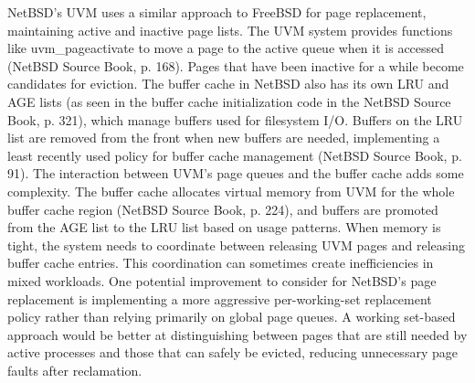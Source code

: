 NetBSD's UVM uses a similar approach to FreeBSD for page replacement, maintaining active and inactive page lists. The UVM system provides functions like uvm\_pageactivate to move a page to the active queue when it is accessed (NetBSD Source Book, p. 168). Pages that have been inactive for a while become candidates for eviction. The buffer cache in NetBSD also has its own LRU and AGE lists (as seen in the buffer cache initialization code in the NetBSD Source Book, p. 321), which manage buffers used for filesystem I/O. Buffers on the LRU list are removed from the front when new buffers are needed, implementing a least recently used policy for buffer cache management (NetBSD Source Book, p. 91).
The interaction between UVM's page queues and the buffer cache adds some complexity. The buffer cache allocates virtual memory from UVM for the whole buffer cache region (NetBSD Source Book, p. 224), and buffers are promoted from the AGE list to the LRU list based on usage patterns. When memory is tight, the system needs to coordinate between releasing UVM pages and releasing buffer cache entries. This coordination can sometimes create inefficiencies in mixed workloads.
One potential improvement to consider for NetBSD's page replacement is implementing a more aggressive per-working-set replacement policy rather than relying primarily on global page queues. A working set-based approach would be better at distinguishing between pages that are still needed by active processes and those that can safely be evicted, reducing unnecessary page faults after reclamation.

